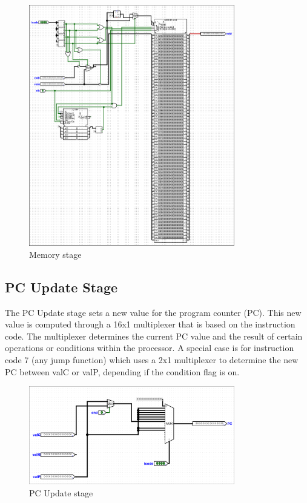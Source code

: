 \documentclass{article}
\begin{document}
\begin{figure}[H]
    \centering
    \includegraphics[width=0.8\textwidth]{./images/memory.png}
    \caption{Memory stage}
\end{figure}

\subsection{PC Update Stage}

The PC Update stage sets a new value for the program counter (PC). 
This new value is computed through a 16x1 multiplexer that is based on the instruction code. 
The multiplexer determines the current PC value and the result of certain operations or conditions within the processor. 
A special case is for instruction code 7 (any jump function) which uses a 2x1 multiplexer to determine the new PC between valC or valP, depending if the condition flag is on. 

\begin{figure}[H]
    \centering
    \includegraphics[width=0.8\textwidth]{./images/pc_update.png}
    \caption{PC Update stage}
\end{figure}
\end{document}
